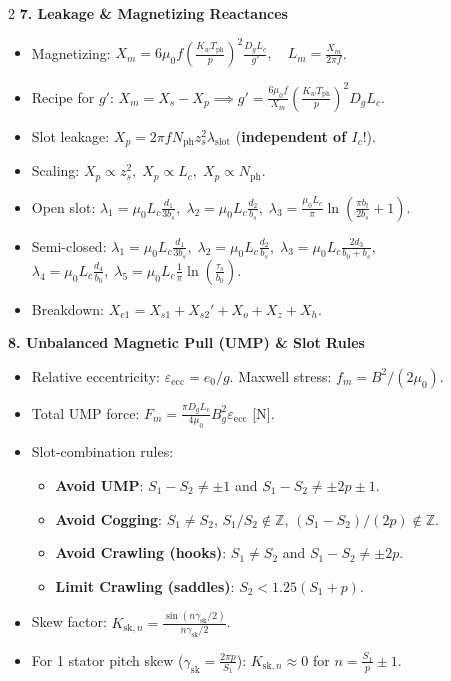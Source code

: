 \begin{multicols}{2}
\textbf{7. Leakage \& Magnetizing Reactances}
\vspace{-0.3em}
\begin{itemize}\setlength{\itemsep}{0pt}\setlength{\parskip}{0pt}
  \item Magnetizing: $X_m = 6\mu_0 f \left(\frac{K_w T_{\mathrm{ph}}}{p}\right)^2 \frac{D_g L_c}{g'},\quad L_m = \frac{X_m}{2\pi f}$.
  \item Recipe for $g'$: $X_m = X_s - X_p \implies g' = \frac{6\mu_0 f}{X_m}\left(\frac{K_w T_{\mathrm{ph}}}{p}\right)^2 D_g L_c$.
  \item Slot leakage: $X_p = 2\pi f N_{\mathrm{ph}} z_s^2 \lambda_{\mathrm{slot}}$ (\textbf{independent of $I_c$}!).
  \item Scaling: $X_p \propto z_s^2,\; X_p \propto L_c,\; X_p \propto N_{\mathrm{ph}}$.
  \item Open slot: $\lambda_1 = \mu_0 L_c \frac{d_1}{3b_s},\; \lambda_2 = \mu_0 L_c \frac{d_2}{b_s},\; \lambda_3 = \frac{\mu_0 L_c}{\pi}\ln(\frac{\pi b_t}{2b_s}+1)$.
  \item Semi-closed: $\lambda_1 = \mu_0 L_c \frac{d_1}{3b_s},\; \lambda_2 = \mu_0 L_c \frac{d_2}{b_s},\; \lambda_3 = \mu_0 L_c \frac{2d_3}{b_0+b_s}$,\\
        $\lambda_4 = \mu_0 L_c \frac{d_4}{b_0},\; \lambda_5 = \mu_0 L_c \frac{1}{\pi}\ln(\frac{\tau_s}{b_0})$.
  \item Breakdown: $X_{e1} = X_{s1} + X_{s2}' + X_o + X_z + X_h$.
\end{itemize}

\textbf{8. Unbalanced Magnetic Pull (UMP) \& Slot Rules}
\vspace{-0.3em}
\begin{itemize}\setlength{\itemsep}{0pt}\setlength{\parskip}{0pt}
  \item Relative eccentricity: $\varepsilon_{\mathrm{ecc}} = e_0/g$. Maxwell stress: $f_m = B^2/(2\mu_0)$.
  \item Total UMP force: $F_m = \frac{\pi D_g L_c}{4\mu_0} B_g^2 \varepsilon_{\mathrm{ecc}}$ [$\mathrm{N}$].
  \item Slot-combination rules:
    \begin{itemize}\setlength{\itemsep}{0pt}
      \item \textbf{Avoid UMP}: $S_1 - S_2 \neq \pm 1$ and $S_1 - S_2 \neq \pm 2p \pm 1$.
      \item \textbf{Avoid Cogging}: $S_1 \neq S_2$, $S_1/S_2 \notin \mathbb{Z}$, $(S_1-S_2)/(2p) \notin \mathbb{Z}$.
      \item \textbf{Avoid Crawling (hooks)}: $S_1 \neq S_2$ and $S_1 - S_2 \neq \pm 2p$.
      \item \textbf{Limit Crawling (saddles)}: $S_2 < 1.25(S_1 + p)$.
    \end{itemize}
  \item Skew factor: $K_{\mathrm{sk},n} = \frac{\sin(n\gamma_{\mathrm{sk}}/2)}{n\gamma_{\mathrm{sk}}/2}$.
  \item For 1 stator pitch skew ($\gamma_{\mathrm{sk}} = \frac{2\pi p}{S_1}$): $K_{\mathrm{sk},n} \approx 0$ for $n = \frac{S_1}{p}\pm 1$.
\end{itemize}


\end{multicols}
